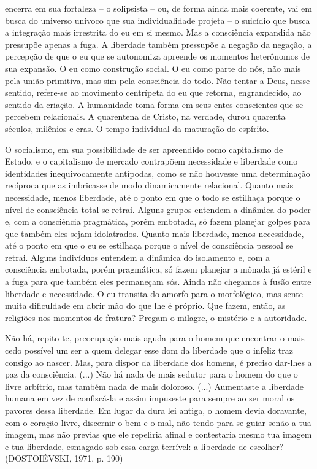 encerra em sua fortaleza -- o solipsista -- ou, de forma ainda mais
coerente, vai em busca do universo unívoco que sua individualidade
projeta -- o suicídio que busca a integração mais irrestrita do eu em si
mesmo. Mas a consciência expandida não pressupõe apenas a fuga. A
liberdade também pressupõe a negação da negação, a percepção de que o eu
que se autonomiza apreende os momentos heterônomos de sua expansão. O eu
como construção social. O eu como parte do nós, não mais pela união
primitiva, mas sim pela consciência do todo. Não tentar a Deus, nesse
sentido, refere-se ao movimento centrípeta do eu que retorna,
engrandecido, ao sentido da criação. A humanidade toma forma em seus
entes conscientes que se percebem relacionais. A quarentena de Cristo,
na verdade, durou quarenta séculos, milênios e eras. O tempo individual
da maturação do espírito.

O socialismo, em sua possibilidade de ser apreendido como capitalismo de
Estado, e o capitalismo de mercado contrapõem necessidade e liberdade
como identidades inequivocamente antípodas, como se não houvesse uma
determinação recíproca que as imbricasse de modo dinamicamente
relacional. Quanto mais necessidade, menos liberdade, até o ponto em que
o todo se estilhaça porque o nível de consciência total se retrai.
Alguns grupos entendem a dinâmica do poder e, com a consciência
pragmática, porém embotada, só fazem planejar golpes para que também
eles sejam idolatrados. Quanto mais liberdade, menos necessidade, até o
ponto em que o eu se estilhaça porque o nível de consciência pessoal se
retrai. Alguns indivíduos entendem a dinâmica do isolamento e, com a
consciência embotada, porém pragmática, só fazem planejar a mônada já
estéril e a fuga para que também eles permaneçam sós. Ainda não chegamos
à fusão entre liberdade e necessidade. O eu transita do amorfo para o
morfológico, mas sente muita dificuldade em abrir mão do que lhe é
próprio. Que fazem, então, as religiões nos momentos de fratura? Pregam
o milagre, o mistério e a autoridade.

Não há, repito-te, preocupação mais aguda para o homem que encontrar o
mais cedo possível um ser a quem delegar esse dom da liberdade que o
infeliz traz consigo ao nascer. Mas, para dispor da liberdade dos
homens, é preciso dar-lhes a paz da consciência. (...) Não há nada de
mais sedutor para o homem do que o livre arbítrio, mas também nada de
mais doloroso. (...) Aumentaste a liberdade humana em vez de confiscá-la
e assim impuseste para sempre ao ser moral os pavores dessa liberdade.
Em lugar da dura lei antiga, o homem devia doravante, com o coração
livre, discernir o bem e o mal, não tendo para se guiar senão a tua
imagem, mas não previas que ele repeliria afinal e contestaria mesmo tua
imagem e tua liberdade, esmagado sob essa carga terrível: a liberdade de
escolher? (DOSTOIÉVSKI, 1971, p. 190)

